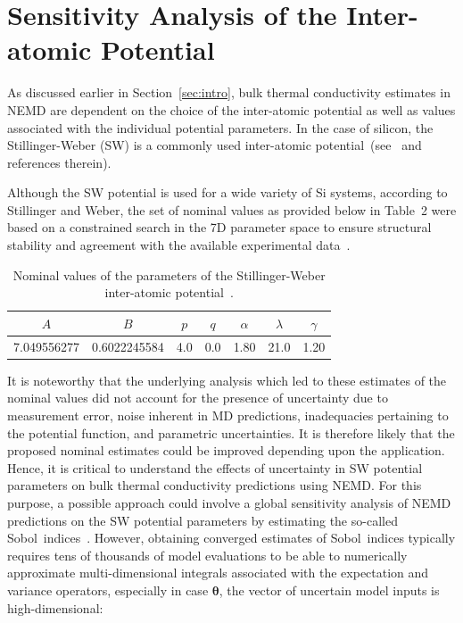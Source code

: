 \section{Sensitivity Analysis of the Inter-atomic Potential}
\label{sec:sense}

As discussed earlier in Section~\ref{sec:intro}, bulk thermal conductivity estimates in NEMD
are dependent on the choice of the inter-atomic potential as well as values associated with
the individual potential parameters. In the case of silicon, the Stillinger-Weber (SW)
is a commonly used inter-atomic potential~(see~\cite{Laradji:1995,Zhang:2014,Jiang:2015,Watanabe:1999,Zhou:2013} and references therein). 

Although the SW potential is used for a wide variety of Si systems, 
according to Stillinger and Weber, the set of nominal
values as provided below in Table~2 were based on a constrained search in the 7D parameter space to ensure structural stability and agreement with the available experimental data~\cite{Stillinger:1985}.

\begin{table}[htbp]
\begin{center}
\begin{tabular}{|c|c|c|c|c|c|c|}
\hline 
$A$ & $B$ & $p$ & $q$ & $\alpha$ & $\lambda$ & $\gamma$ \\
\hline \hline
7.049556277 & 0.6022245584 & 4.0 & 0.0 & 1.80 & 21.0 & 1.20 \\
\hline
\end{tabular}
\end{center}
\caption{Nominal values of the parameters of the Stillinger-Weber inter-atomic
potential~\cite{Stillinger:1985}.}
\end{table}

It is noteworthy that the underlying analysis which led to these estimates of the nominal values did not
account for the presence of uncertainty due to
measurement error, noise inherent in MD predictions, inadequacies pertaining to the potential function,
and parametric uncertainties. It is therefore likely that the proposed nominal estimates could be 
improved depending upon the application. Hence, it is critical to understand the effects of uncertainty in
SW potential parameters on bulk thermal conductivity predictions using NEMD. For this purpose, a possible
approach could involve a global sensitivity analysis of NEMD predictions on the SW potential parameters 
by estimating the so-called Sobol\textquotesingle~indices~\cite{Sobol:2001}. However, obtaining converged estimates of
Sobol\textquotesingle~indices typically requires tens of thousands of model evaluations to be able to numerically approximate
multi-dimensional integrals associated with the expectation and variance operators, especially in case $\bm{\theta}$,
the vector of uncertain model inputs is high-dimensional:

